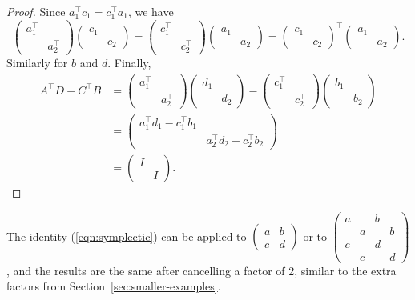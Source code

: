 \documentclass[11pt]{amsart}
\theoremstyle{definition}
\numberwithin{figure}{section}
\numberwithin{equation}{section}
\numberwithin{table}{section}
\begin{document}
\begin{proof}
Since $a_1^{\top}c_1 = c_1^{\top} a_1$, we have
\[
\begin{pmatrix} a_1^{\top} & \\  &a _2^{\top}  \end{pmatrix} \begin{pmatrix}  c_1 & \\  &  c_2 \end{pmatrix}
=
\begin{pmatrix} c_1^{\top} & \\  &c _2^{\top}  \end{pmatrix} \begin{pmatrix}  a_1 & \\  &  a_2 \end{pmatrix}
=\begin{pmatrix} c_1 & \\ & c_2 \end{pmatrix}^{\top} \begin{pmatrix}  a_1 & \\  &  a_2 \end{pmatrix}
.
\]
Similarly for $b$ and $d$. Finally,
\begin{align*}
A^{\top}D-C^{\top}B &= \begin{pmatrix} a_1^{\top} & \\ & a_2^{\top} \end{pmatrix}
\begin{pmatrix} d_1 & \\ & d_2 \end{pmatrix}
-
\begin{pmatrix} c_1^{\top} & \\ & c_2^{\top} \end{pmatrix}
\begin{pmatrix} b_1 & \\ & b_2 \end{pmatrix} \\
&= \begin{pmatrix} a_1^{\top}d_1 - c_1^{\top}b_1 & \\ & a_2^{\top}d_2-c_2^{\top}b_2 \end{pmatrix}
\\
&= \begin{pmatrix} I & \\ & I \end{pmatrix}
.
\end{align*}
\end{proof}
The identity (\ref{eqn:symplectic}) can be applied to $\begin{pmatrix} a & b \\ c & d \end{pmatrix}$ or to $\begin{pmatrix} a & & b & \\ & a & & b \\ c & & d & \\ & c & & d \end{pmatrix}$, and the results are the same after cancelling a factor of 2, similar to the extra factors from Section~\ref{sec:smaller-examples}.
\end{document}
